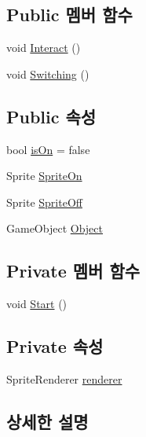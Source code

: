 \subsection*{Public 멤버 함수}
\begin{DoxyCompactItemize}
\item 
void \mbox{\hyperlink{class_switch_ae6359a4d03949a03a05f119273778e08}{Interact}} ()
\item 
void \mbox{\hyperlink{class_switch_aa9e707177e783ebd452392797188abcd}{Switching}} ()
\end{DoxyCompactItemize}
\subsection*{Public 속성}
\begin{DoxyCompactItemize}
\item 
bool \mbox{\hyperlink{class_switch_ab0eb51a8286838002553f383e8e6a2a9}{is\+On}} = false
\item 
Sprite \mbox{\hyperlink{class_switch_adbf1538e9ec1b9eee4f7ca41ecc33db2}{Sprite\+On}}
\item 
Sprite \mbox{\hyperlink{class_switch_a6e98de87792cc468654d8aa0d2beede6}{Sprite\+Off}}
\item 
Game\+Object \mbox{\hyperlink{class_switch_a0d13004c1df964c597024b601235f679}{Object}}
\end{DoxyCompactItemize}
\subsection*{Private 멤버 함수}
\begin{DoxyCompactItemize}
\item 
void \mbox{\hyperlink{class_switch_ae2b801ac5612e717059ef7a68477bb29}{Start}} ()
\end{DoxyCompactItemize}
\subsection*{Private 속성}
\begin{DoxyCompactItemize}
\item 
Sprite\+Renderer \mbox{\hyperlink{class_switch_ae41569b4d13a765d054274eb2631016f}{renderer}}
\end{DoxyCompactItemize}


\subsection{상세한 설명}


